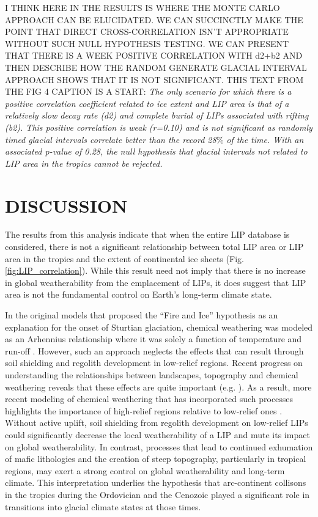 \documentclass[11pt,letterpaper]{article}
\begin{document}
I THINK HERE IN THE RESULTS IS WHERE THE MONTE CARLO APPROACH CAN BE ELUCIDATED. WE CAN SUCCINCTLY MAKE THE POINT THAT DIRECT CROSS-CORRELATION ISN'T APPROPRIATE WITHOUT SUCH NULL HYPOTHESIS TESTING. WE CAN PRESENT THAT THERE IS A WEEK POSITIVE CORRELATION WITH d2+b2 AND THEN DESCRIBE HOW THE RANDOM GENERATE GLACIAL INTERVAL APPROACH SHOWS THAT IT IS NOT SIGNIFICANT. THIS TEXT FROM THE FIG 4 CAPTION IS A START:
\textit{The only scenario for which there is a positive correlation coefficient related to ice extent and LIP area is that of a relatively slow decay rate (d2) and complete burial of LIPs associated with rifting (b2). This positive correlation is weak (\textit{r}=0.10) and is not significant as randomly timed glacial intervals correlate better than the record 28$\%$ of the time. With an associated p-value of 0.28, the null hypothesis that glacial intervals not related to LIP area in the tropics cannot be rejected.}

\section*{DISCUSSION}

The results from this analysis indicate that when the entire LIP database is considered, there is not a significant relationship between total LIP area or LIP area in the tropics and the extent of continental ice sheets (Fig. \ref{fig:LIP_correlation}). While this result need not imply that there is no increase in global weatherability from the emplacement of LIPs, it does suggest that LIP area is not the fundamental control on Earth's long-term climate state.

In the original models that proposed the ``Fire and Ice'' hypothesis as an explanation for the onset of Sturtian glaciation, chemical weathering was modeled as an Arhennius relationship where it was solely a function of temperature and run-off \citep{Donnadieu2004a}. However, such an approach neglects the effects that can result through soil shielding and regolith development in low-relief regions. Recent progress on understanding the relationships between landscapes, topography and chemical weathering reveals that these effects are quite important (e.g. \citealp{Maher2014a}). As a result, more recent modeling of chemical weathering that has incorporated such processes highlights the importance of high-relief regions relative to low-relief ones \citep{Godderis2017b}. Without active uplift, soil shielding from regolith development on low-relief LIPs could significantly decrease the local weatherability of a LIP and mute its impact on global weatherability. In contrast, processes that lead to continued exhumation of mafic lithologies and the creation of steep topography, particularly in tropical regions, may exert a strong control on global weatherability and long-term climate. This interpretation underlies the hypothesis that arc-continent collisons in the tropics during the Ordovician \citep{Swanson-Hysell2017a} and the Cenozoic \citep{Jagoutz2016a} played a significant role in transitions into glacial climate states at those times.
\end{document}
